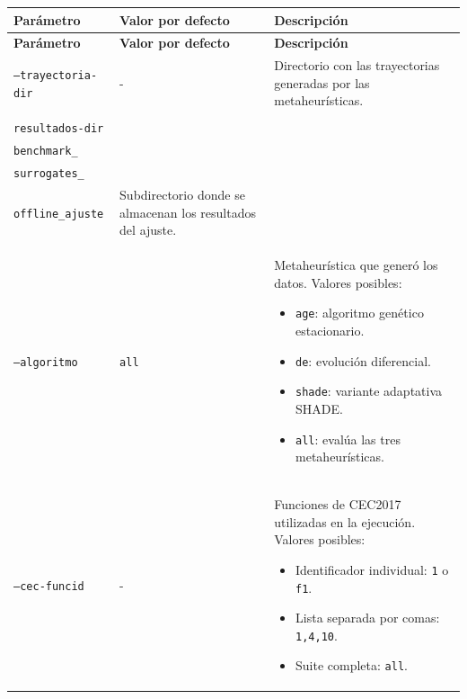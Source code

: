 \begin{longtable}[htbp]{|p{4.2cm}|p{2.2cm}|p{4.85cm}|}
    \hline
    \textbf{Parámetro} & \textbf{Valor por defecto}                                                    & \textbf{Descripción} \\
    \hline
    \endfirsthead

    \hline
    \textbf{Parámetro} & \textbf{Valor por defecto}                                                    & \textbf{Descripción} \\
    \hline
    \endhead

    \texttt{--trayectoria-dir}
                       & -
                       & Directorio con las trayectorias generadas por las metaheurísticas.                                   \\
    \hline

    \makecell[l]{\texttt{--ajuste-}                                                                                           \\\texttt{resultados-dir}}
                       & \makecell[l]{\scriptsize\texttt{resultados\_}                                                        \\\scriptsize\texttt{benchmark\_}      \\\scriptsize\texttt{surrogates\_}      \\\scriptsize\texttt{offline\_ajuste}}
                       & Subdirectorio donde se almacenan los resultados del ajuste.                                          \\
    \hline

    \texttt{--algoritmo}
                       & \texttt{all}
                       & Metaheurística que generó los datos. Valores posibles:
    \begin{itemize}
        \setlength{\itemsep}{0pt}
        \setlength{\topsep}{2pt}
        \item \texttt{age}: algoritmo genético estacionario.
        \item \texttt{de}: evolución diferencial.
        \item \texttt{shade}: variante adaptativa SHADE.
        \item \texttt{all}: evalúa las tres metaheurísticas.
    \end{itemize}                                                                       \\
    \hline

    \texttt{--cec-funcid}
                       & -
                       & Funciones de CEC2017 utilizadas en la ejecución. Valores posibles:
    \begin{itemize}
        \setlength{\itemsep}{0pt}
        \setlength{\topsep}{2pt}
        \item Identificador individual: \texttt{1} o \texttt{f1}.
        \item Lista separada por comas: \texttt{1,4,10}.
        \item Suite completa: \texttt{all}.
    \end{itemize}                                                                  \\
    \hline


\end{longtable}
